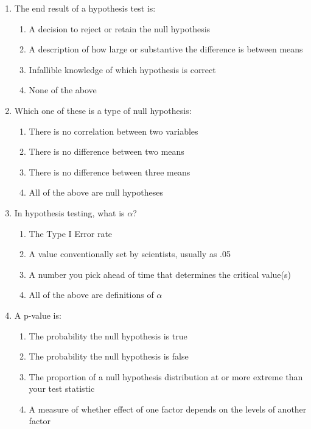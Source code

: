 \documentclass{article}
\begin{document}
\begin{enumerate}[label=\textbf{Q\arabic*:}]
    \item The end result of a hypothesis test is:
    \begin{enumerate}[label=\alph*)]
        \item A decision to reject or retain the null hypothesis
        \item A description of how large or substantive the difference is between means
        \item Infallible knowledge of which hypothesis is correct
        \item None of the above
    \end{enumerate}

    \item Which one of these is a type of null hypothesis:
    \begin{enumerate}[label=\alph*)]
        \item There is no correlation between two variables
        \item There is no difference between two means
        \item There is no difference between three means
        \item All of the above are null hypotheses
    \end{enumerate}

    \item In hypothesis testing, what is $\alpha$?
    \begin{enumerate}[label=\alph*)]
        \item The Type I Error rate
        \item A value conventionally set by scientists, usually as .05
        \item A number you pick ahead of time that determines the critical value(s)
        \item All of the above are definitions of $\alpha$
    \end{enumerate}

    \item A p-value is:
    \begin{enumerate}[label=\alph*)]
        \item The probability the null hypothesis is true
        \item The probability the null hypothesis is false
        \item The proportion of a null hypothesis distribution at or more extreme than your test statistic
        \item A measure of whether effect of one factor depends on the levels of another factor
    \end{enumerate}


\end{enumerate}
\end{document}

